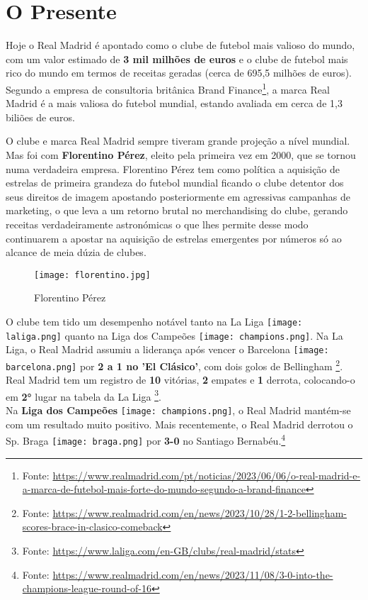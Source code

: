 \documentclass{report}
\begin{document}
\section{O Presente}

Hoje o Real Madrid é apontado como o clube de futebol mais valioso do mundo, com um valor estimado de \textbf{3 mil milhões de euros} e o clube de futebol mais rico do mundo em termos de receitas geradas (cerca de 695,5 milhões de euros). Segundo a empresa de consultoria britânica Brand Finance\footnote{Fonte: \url{https://www.realmadrid.com/pt/noticias/2023/06/06/o-real-madrid-e-a-marca-de-futebol-mais-forte-do-mundo-segundo-a-brand-finance}}, a marca Real Madrid é a mais valiosa do futebol mundial, estando avaliada em cerca de 1,3 biliões de euros.

O clube e marca Real Madrid sempre tiveram grande projeção a nível mundial. Mas foi com \textbf{Florentino Pérez}, eleito pela primeira vez em 2000, que se tornou numa verdadeira empresa. Florentino Pérez tem como política a aquisição de estrelas de primeira grandeza do futebol mundial ficando o clube detentor dos seus direitos de imagem apostando posteriormente em agressivas campanhas de marketing, o que leva a um retorno brutal no merchandising do clube, gerando receitas verdadeiramente astronómicas o que lhes permite desse modo continuarem a apostar na aquisição de estrelas emergentes por números só ao alcance de meia dúzia de clubes.
\begin{figure}[h]
    \center
    \texttt{[image: florentino.jpg]}
    \caption{Florentino Pérez}
    \label{fig:florentino}
\end{figure}

O clube tem tido um desempenho notável tanto na La Liga \texttt{[image: laliga.png]} quanto na Liga dos Campeões \texttt{[image: champions.png]}. Na La Liga, o Real Madrid assumiu a liderança após vencer o Barcelona \texttt{[image: barcelona.png]} por \textbf{2 a 1 no 'El Clásico'}, com dois golos de Bellingham \footnote{Fonte: \url{https://www.realmadrid.com/en/news/2023/10/28/1-2-bellingham-scores-brace-in-clasico-comeback}}. Real Madrid tem um registro de \textbf{10} vitórias, \textbf{2} empates e \textbf{1} derrota, colocando-o em \textbf{2°} lugar na tabela da La Liga \footnote{Fonte: \url{https://www.laliga.com/en-GB/clubs/real-madrid/stats}}.
\\    

Na \textbf{Liga dos Campeões} \texttt{[image: champions.png]}, o Real Madrid mantém-se com um resultado muito positivo. Mais recentemente, o Real Madrid\cite{realmadrid-estatisticas} derrotou o Sp. Braga \texttt{[image: braga.png]} por \textbf{3-0} no Santiago Bernabéu.\footnote{Fonte: \url{https://www.realmadrid.com/en/news/2023/11/08/3-0-into-the-champions-league-round-of-16}}
\\    
\end{document}
